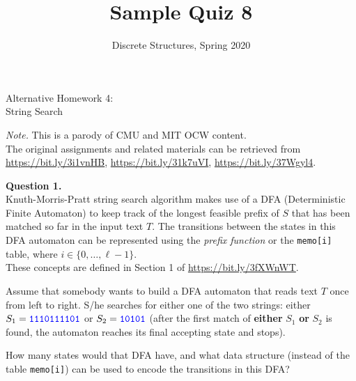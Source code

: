 \documentclass[jou]{apa6}
\title{Sample Quiz 8}
\author{Discrete Structures, Spring 2020}
\affiliation{RBS}
\begin{document}
\twocolumn
\thispagestyle{empty}

\begin{center}
{\Large Alternative Homework 4:}\\
{\Large String Search}
\end{center}


\begin{changemargin}{10pt}{10pt}
{\footnotesize
{\em Note.} This is a parody of CMU and MIT OCW content.\\
The original assignments and related materials can be retrieved from 
\url{https://bit.ly/3i1vnHB}, \url{https://bit.ly/31k7uVI},
\url{https://bit.ly/37Wgyl4}.
}
\end{changemargin}





\vspace{4pt}
{\bf Question 1.}\\
Knuth-Morris-Pratt string search algorithm makes use of a DFA (Deterministic Finite Automaton)
to keep track of the longest feasible prefix of $S$ that has been matched so far in the input text $T$. 
The transitions between the states in this DFA automaton can be represented using 
the {\em prefix function} or the {\tt memo[i]} table, where $i \in \{ 0,\ldots,\ell{}-1 \}$.\\
These concepts are defined in Section 1 of \url{https://bit.ly/3fXWnWT}. 

Assume that somebody wants to build a DFA automaton that reads text $T$ once from left to right. 
S/he searches for either one of the two strings: either $S_1 = \textcolor{blue}{\mathtt{1110111101}}$ 
or $S_2 = \textcolor{blue}{\mathtt{10101}}$ (after the first match of {\bf either} $S_1$ {\bf or} $S_2$ 
is found, the automaton reaches its final accepting state and stops).

How many states would that DFA have, and what data structure (instead of the table {\tt memo[i]}) can 
be used to encode the transitions in this DFA?
\end{document}
